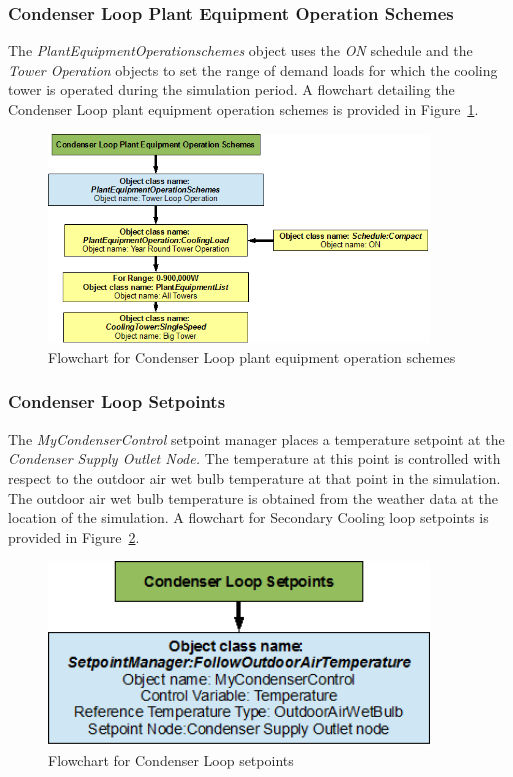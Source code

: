 \subsubsection{Condenser Loop Plant Equipment Operation Schemes}\label{condenser-loop-plant-equipment-operation-schemes-000}

The \emph{PlantEquipmentOperationschemes} object uses the \emph{ON} schedule and the \emph{Tower Operation} objects to set the range of demand loads for which the cooling tower is operated during the simulation period. A flowchart detailing the Condenser Loop plant equipment operation schemes is provided in Figure~\ref{fig:flowchart-for-condenser-loop-plant-equipment-operation-002}.

\begin{figure}[hbtp] %
\centering
\includegraphics[width=0.9\textwidth, height=0.9\textheight, keepaspectratio=true]{media/image126.png}
\caption{Flowchart for Condenser Loop plant equipment operation schemes \protect \label{fig:flowchart-for-condenser-loop-plant-equipment-operation-002}}
\end{figure}

\subsubsection{Condenser Loop Setpoints}\label{condenser-loop-setpoints-000}

The \emph{MyCondenserControl} setpoint manager places a temperature setpoint at the \emph{Condenser Supply Outlet Node.} The temperature at this point is controlled with respect to the outdoor air wet bulb temperature at that point in the simulation. The outdoor air wet bulb temperature is obtained from the weather data at the location of the simulation. A flowchart for Secondary Cooling loop setpoints is provided in Figure~\ref{fig:flowchart-for-condenser-loop-setpoints-002}.

\begin{figure}[hbtp] %
\centering
\includegraphics[width=0.9\textwidth, height=0.9\textheight, keepaspectratio=true]{media/image127.png}
\caption{Flowchart for Condenser Loop setpoints \protect \label{fig:flowchart-for-condenser-loop-setpoints-002}}
\end{figure}
